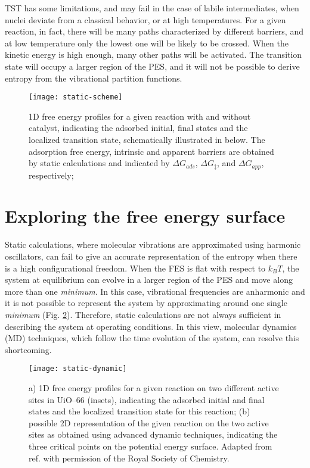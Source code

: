 \npar
TST has some limitations, and may fail in the case of labile intermediates, when nuclei deviate from a classical behavior, or at high temperatures. For a given reaction, in fact, there will be many paths characterized by different barriers, and at low temperature only the lowest one will be likely to be crossed. When the kinetic energy is high enough, many other paths will be activated. The transition state will occupy a larger region of the PES, and it will not be possible to derive entropy from the vibrational partition functions.
\begin{figure}[!htbp]
	\centering
 	\texttt{[image: static-scheme]}
	\caption{1D free energy profiles for a given reaction with and without catalyst, indicating the adsorbed initial, final states and the localized transition state, schematically illustrated in below. The adsorption free energy, intrinsic and apparent barriers are obtained by static calculations and indicated by $\Delta G_{ads}$, $\Delta G_{\ddagger}$, and $\Delta G_{app}$, respectively;}
	\label{fig:static-scheme}
\end{figure}


\section{Exploring the free energy surface}
Static calculations, where molecular vibrations are approximated using harmonic oscillators, can fail to give an accurate representation of the entropy when there is a high configurational freedom. When the FES is flat with respect to $k_B T$, the system at equilibrium can evolve in a larger region of the PES and move along more than one \textit{minimum}. In this case, vibrational frequencies are anharmonic and it is not possible to represent the system by approximating around one single \textit{minimum} (Fig. \ref{fig:static-dynamic}). Therefore, static calculations are not always sufficient in describing the system at operating conditions. In this view, molecular dynamics (MD) techniques, which follow the time evolution of the system, can resolve this shortcoming.
\begin{figure}[!htbp]
	\centering
 	\texttt{[image: static-dynamic]}
	\caption{a) 1D free energy profiles for a given reaction on two different active sites in UiO--66 (insets), indicating the adsorbed initial and final states and the localized transition state for this reaction; (b) possible 2D representation of the given reaction on the two active sites as obtained using advanced dynamic techniques, indicating the three critical points on the potential energy surface. Adapted from ref. \cite{rogge2017metal} with permission of the Royal Society of Chemistry.}
	\label{fig:static-dynamic}
\end{figure}

